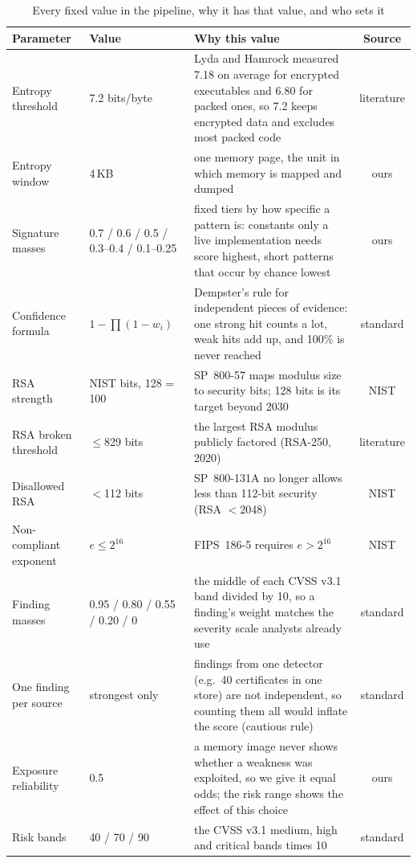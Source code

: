 \begin{table}[t]
\centering
\caption{Every fixed value in the pipeline, why it has that value, and who sets it}
\label{tab:choices}
\footnotesize
\begin{tabularx}{\textwidth}{@{}p{37mm}p{26mm}Xc@{}}
\toprule
Parameter & Value & Why this value & Source\\
\midrule
Entropy threshold & 7.2 bits/byte & Lyda and Hamrock measured 7.18 on average for encrypted executables and 6.80 for packed ones, so 7.2 keeps encrypted data and excludes most packed code & literature\\
Entropy window & 4\,KB & one memory page, the unit in which memory is mapped and dumped & ours\\
Signature masses & 0.7 / 0.6 / 0.5 / 0.3--0.4 / 0.1--0.25 & fixed tiers by how specific a pattern is: constants only a live implementation needs score highest, short patterns that occur by chance lowest & ours\\
Confidence formula & $1-\prod(1-w_i)$ & Dempster's rule for independent pieces of evidence: one strong hit counts a lot, weak hits add up, and 100\% is never reached & standard\\
RSA strength & NIST bits, 128 = 100 & SP~800-57 maps modulus size to security bits; 128 bits is its target beyond 2030 & NIST\\
RSA broken threshold & $\le$829 bits & the largest RSA modulus publicly factored (RSA-250, 2020) & literature\\
Disallowed RSA & $<$112 bits & SP~800-131A no longer allows less than 112-bit security (RSA $<$2048) & NIST\\
Non-compliant exponent & $e \le 2^{16}$ & FIPS~186-5 requires $e > 2^{16}$ & NIST\\
Finding masses & 0.95 / 0.80 / 0.55 / 0.20 / 0 & the middle of each CVSS v3.1 band divided by 10, so a finding's weight matches the severity scale analysts already use & standard\\
One finding per source & strongest only & findings from one detector (e.g.\ 40 certificates in one store) are not independent, so counting them all would inflate the score (cautious rule) & standard\\
Exposure reliability & 0.5 & a memory image never shows whether a weakness was exploited, so we give it equal odds; the risk range shows the effect of this choice & ours\\
Risk bands & 40 / 70 / 90 & the CVSS v3.1 medium, high and critical bands times 10 & standard\\

\end{tabularx}
\end{table}
